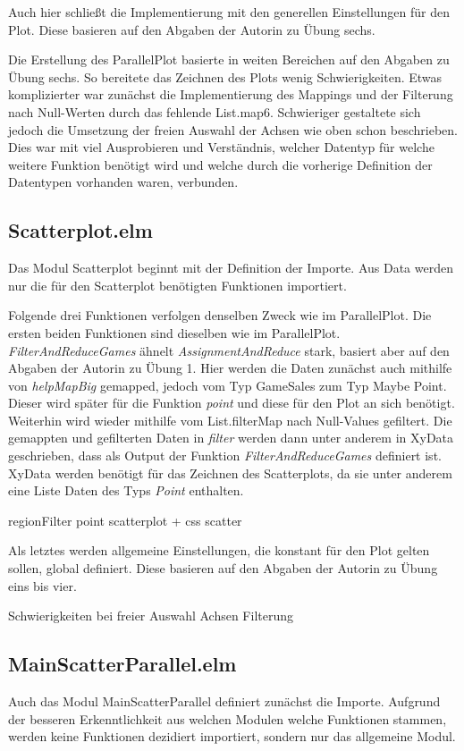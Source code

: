 \documentclass[usegeometry=true]{scrartcl}
\begin{document}
Auch hier schließt die Implementierung mit den generellen Einstellungen für den Plot. Diese basieren auf den Abgaben der Autorin zu Übung sechs. 

Die Erstellung des ParallelPlot basierte in weiten Bereichen auf den Abgaben zu Übung sechs. So bereitete das Zeichnen des Plots wenig Schwierigkeiten. 
Etwas komplizierter war zunächst die Implementierung des Mappings und der Filterung nach Null-Werten durch das fehlende List.map6. 
Schwieriger gestaltete sich jedoch die Umsetzung der freien Auswahl der Achsen wie oben schon beschrieben. 
Dies war mit viel Ausprobieren und Verständnis, welcher Datentyp für welche weitere Funktion benötigt wird und welche durch die vorherige Definition der Datentypen vorhanden waren, verbunden.

\subsection{Scatterplot.elm}
Das Modul Scatterplot beginnt mit der Definition der Importe. Aus Data werden nur die für den Scatterplot benötigten Funktionen importiert. 

Folgende drei Funktionen verfolgen denselben Zweck wie im ParallelPlot.
Die ersten beiden Funktionen sind dieselben wie im ParallelPlot.
\textit{FilterAndReduceGames} ähnelt \textit{AssignmentAndReduce} stark, basiert aber auf den Abgaben der Autorin zu Übung 1.
Hier werden die Daten zunächst auch mithilfe von \textit{helpMapBig} gemapped, jedoch vom Typ GameSales zum Typ Maybe Point. 
Dieser wird später für die Funktion \textit{point} und diese für den Plot an sich benötigt.
Weiterhin wird wieder mithilfe vom List.filterMap nach Null-Values gefiltert. 
Die gemappten und gefilterten Daten in \textit{filter} werden dann unter anderem in XyData geschrieben, dass als Output der Funktion \textit{FilterAndReduceGames} definiert ist.
XyData werden benötigt für das Zeichnen des Scatterplots, da sie unter anderem eine Liste Daten des Typs \textit{Point} enthalten.

regionFilter
point
scatterplot + css scatter

Als letztes werden allgemeine Einstellungen, die konstant für den Plot gelten sollen, global definiert. 
Diese basieren auf den Abgaben der Autorin zu Übung eins bis vier.

Schwierigkeiten bei freier Auswahl Achsen
Filterung
\subsection{MainScatterParallel.elm}
Auch das Modul MainScatterParallel definiert zunächst die Importe. 
Aufgrund der besseren Erkenntlichkeit aus welchen Modulen welche Funktionen stammen, werden keine Funktionen dezidiert importiert, sondern nur das allgemeine Modul. 
\end{document}

